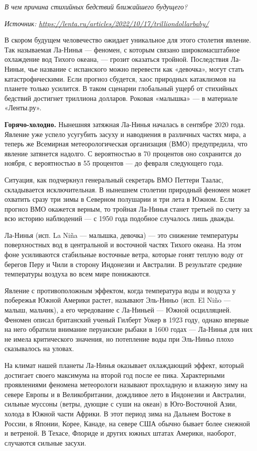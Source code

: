 \textit{В чем причина стихийных бедствий ближайшего будущего?}

\textit{Источник: \url{https://lenta.ru/articles/2022/10/17/trilliondollarbaby/}}

В скором будущем человечество ожидает уникальное для этого столетия явление. Так называемая Ла-Нинья — феномен, с которым связано широкомасштабное охлаждение вод Тихого океана, — грозит оказаться тройной. Последствия Ла-Ниньи, чье название с испанского можно перевести как «девочка», могут стать катастрофическими. Если прогноз сбудется, хаос природных катаклизмов на планете только усилится. В таком сценарии глобальный ущерб от стихийных бедствий достигнет триллиона долларов. Роковая «малышка» — в материале «Ленты.ру».

\textbf{Горячо-холодно.} Нынешняя затяжная Ла-Нинья началась в сентябре 2020 года. Явление уже успело усугубить засуху и наводнения в различных частях мира, а теперь же Всемирная метеорологическая организация (ВМО) предупредила, что явление затянется надолго. С вероятностью в 70 процентов оно сохранится до ноября, с вероятностью в 55 процентов — до февраля следующего года.

Ситуация, как подчеркнул генеральный секретарь ВМО Петтери Таалас, складывается исключительная. В нынешнем столетии природный феномен может охватить сразу три зимы в Северном полушарии и три лета в Южном. Если прогноз ВМО окажется верным, то тройная Ла-Нинья станет третьей по счету за всю историю наблюдений — с 1950 года подобное случалось лишь дважды.

Ла-Нинья (исп. La Niña — малышка, девочка) — это снижение температуры поверхностных вод в центральной и восточной частях Тихого океана. На этом фоне усиливаются стабильные восточные ветра, которые гонят теплую воду от берегов Перу и Чили в сторону Индонезии и Австралии. В результате средние температуры воздуха во всем мире понижаются.

Явление с противоположным эффектом, когда температура воды и воздуха у побережья Южной Америки растет, называют Эль-Ниньо (исп. El Niño — малыш, мальчик), а его чередование с Ла-Ниньей — Южной осцилляцией. Феномен описал британский ученый Гилберт Уокер в 1923 году, однако впервые на него обратили внимание перуанские рыбаки в 1600 годах — Ла-Нинья для них не имела критического значения, но потепление воды при Эль-Ниньо плохо сказывалось на уловах.

На климат нашей планеты Ла-Нинья оказывает охлаждающий эффект, который достигает своего максимума на второй год после ее пика. Характерными проявлениями феномена метеорологи называют прохладную и влажную зиму на севере Европы и в Великобритании, дождливое лето в Индонезии и Австралии, сильные муссоны (ветры, дующие с суши на океан) в Юго-Восточной Азии, холода в Южной части Африки. В этот период зима на Дальнем Востоке в России, в Японии, Корее, Канаде, на севере США обычно бывает более снежной и ветреной. В Техасе, Флориде и других южных штатах Америки, наоборот, случаются сильные засухи.

